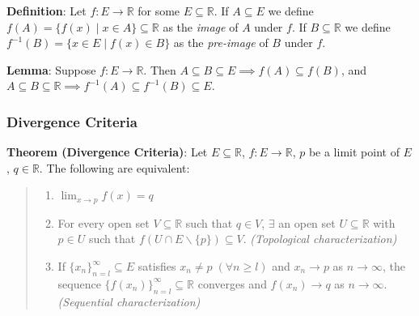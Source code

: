 \documentclass[11pt]{article}
\begin{document}
\textbf{Definition}: Let $f : E \to \mathbb{R}$ for some $E \subseteq \mathbb{R}$. If $A \subseteq E$ we define $f(A) = \{f(x) \;|\; x \in A\} \subseteq \mathbb{R}$ as the \emph{image} of $A$ under $f$. If $B \subseteq \mathbb{R}$ we define $f^{-1}(B) = \{x \in E \;|\; f(x) \in B\}$ as the \emph{pre-image} of $B$ under $f$.

\textbf{Lemma}: Suppose $f : E \to \mathbb{R}$. Then $A \subseteq B \subseteq E \implies f(A) \subseteq f(B)$, and\\
$A \subseteq B \subseteq \mathbb{R} \implies f^{-1}(A) \subseteq f^{-1}(B) \subseteq E$.

\subsubsection{Divergence Criteria}

\textbf{Theorem (Divergence Criteria)}: Let $E \subseteq \mathbb{R}$, $f : E \to \mathbb{R}$, $p$ be a limit point of $E$, $q \in \mathbb{R}$. The following are equivalent:
\begin{quote}\vspace{-0.3cm}
	\begin{enumerate}
	\item $\lim_{x \to p} f(x) = q$
	\item For every open set $V \subseteq \mathbb{R}$ such that $q \in V$, $\exists$ an open set $U \subseteq \mathbb{R}$ with $p \in U$ such that $f(U \cap E \backslash \{p\}) \subseteq V$. \emph{(Topological characterization)}
	\item If $\{x_n\}_{n=l}^\infty \subseteq E$ satisfies $x_n \neq p \;(\forall n \geq l)$ and $x_n \to p$ as $n \to \infty$, the sequence $\{f(x_n)\}_{n=l}^\infty \subseteq \mathbb{R}$ converges and $f(x_n) \to q$ as $n \to \infty$. \emph{(Sequential characterization)}
	\end{enumerate}
\end{quote}
\end{document}
